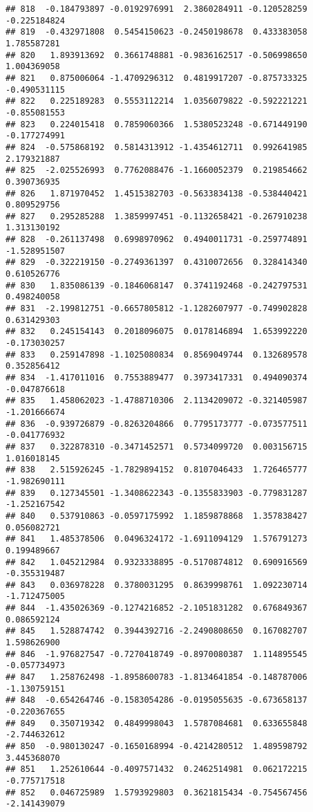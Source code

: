 \documentclass[
]{article}
\begin{document}
\begin{verbatim}
## 818  -0.184793897 -0.0192976991  2.3860284911 -0.120528259 -0.225184824
## 819  -0.432971808  0.5454150623 -0.2450198678  0.433383058  1.785587281
## 820   1.893913692  0.3661748881 -0.9836162517 -0.506998650  1.004369058
## 821   0.875006064 -1.4709296312  0.4819917207 -0.875733325 -0.490531115
## 822   0.225189283  0.5553112214  1.0356079822 -0.592221221 -0.855081553
## 823   0.224015418  0.7859060366  1.5380523248 -0.671449190 -0.177274991
## 824  -0.575868192  0.5814313912 -1.4354612711  0.992641985  2.179321887
## 825  -2.025526993  0.7762088476 -1.1660052379  0.219854662  0.390736935
## 826   1.871970452  1.4515382703 -0.5633834138 -0.538440421  0.809529756
## 827   0.295285288  1.3859997451 -0.1132658421 -0.267910238  1.313130192
## 828  -0.261137498  0.6998970962  0.4940011731 -0.259774891 -1.528951507
## 829  -0.322219150 -0.2749361397  0.4310072656  0.328414340  0.610526776
## 830   1.835086139 -0.1846068147  0.3741192468 -0.242797531  0.498240058
## 831  -2.199812751 -0.6657805812 -1.1282607977 -0.749902828  0.631429303
## 832   0.245154143  0.2018096075  0.0178146894  1.653992220 -0.173030257
## 833   0.259147898 -1.1025080834  0.8569049744  0.132689578  0.352856412
## 834  -1.417011016  0.7553889477  0.3973417331  0.494090374 -0.047876618
## 835   1.458062023 -1.4788710306  2.1134209072 -0.321405987 -1.201666674
## 836  -0.939726879 -0.8263204866  0.7795173777 -0.073577511 -0.041776932
## 837   0.322878310 -0.3471452571  0.5734099720  0.003156715  1.016018145
## 838   2.515926245 -1.7829894152  0.8107046433  1.726465777 -1.982690111
## 839   0.127345501 -1.3408622343 -0.1355833903 -0.779831287 -1.252167542
## 840   0.537910863 -0.0597175992  1.1859878868  1.357838427  0.056082721
## 841   1.485378506  0.0496324172 -1.6911094129  1.576791273  0.199489667
## 842   1.045212984  0.9323338895 -0.5170874812  0.690916569 -0.355319487
## 843   0.036978228  0.3780031295  0.8639998761  1.092230714 -1.712475005
## 844  -1.435026369 -0.1274216852 -2.1051831282  0.676849367  0.086592124
## 845   1.528874742  0.3944392716 -2.2490808650  0.167082707  1.598626900
## 846  -1.976827547 -0.7270418749 -0.8970080387  1.114895545 -0.057734973
## 847   1.258762498 -1.8958600783 -1.8134641854 -0.148787006 -1.130759151
## 848  -0.654264746 -0.1583054286 -0.0195055635 -0.673658137 -0.220367655
## 849   0.350719342  0.4849998043  1.5787084681  0.633655848 -2.744632612
## 850  -0.980130247 -0.1650168994 -0.4214280512  1.489598792  3.445368070
## 851   1.252610644 -0.4097571432  0.2462514981  0.062172215 -0.775717518
## 852   0.046725989  1.5793929803  0.3621815434 -0.754567456 -2.141439079

\end{verbatim}
\end{document}
